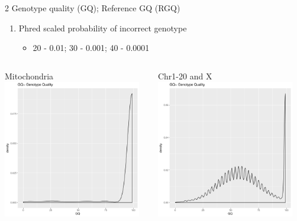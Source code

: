 \documentclass[t,10pt]{beamer}
\begin{document}
\begin{frame}[label={sec:orgheadline9}]{2 Genotype quality (GQ); Reference GQ (RGQ)}
\begin{enumerate}
\item Phred scaled probability of incorrect genotype
\begin{itemize}
\item 20 - 0.01; 30 - 0.001; 40 - 0.0001
\end{itemize}
\end{enumerate}
\vspace{-15.5pt}
\begin{columns}
\begin{column}{0.5\columnwidth}
\begin{block}{Mitochondria}
\includegraphics[width=6cm,height=6cm]{figures/chrM/document-page6.png}
\end{block}
\end{column}
\begin{column}{0.5\columnwidth}
\begin{block}{Chr1-20 and X}
\includegraphics[width=6cm,height=6cm]{figures/NO_chrM/document-page6.png}
\end{block}
\end{column}
\end{columns}
\end{frame}
\end{document}
